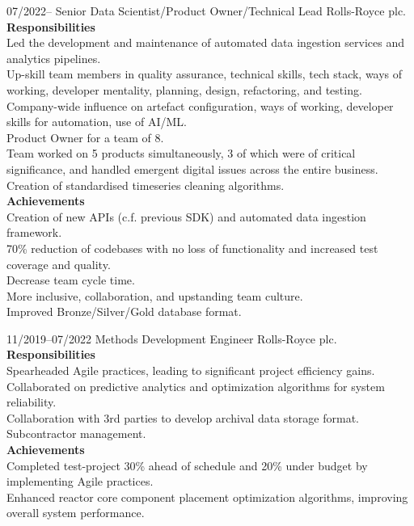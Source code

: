\documentclass[8pt]{developercv}
\begin{document}
\begin{entrylist}
	\entry
	{07/2022--}
	{Senior Data Scientist/Product Owner/Technical Lead}
	{Rolls-Royce plc.}
	{
		\textbf{Responsibilities}\\
		Led the development and maintenance of automated data ingestion services and
		analytics pipelines.\\
		Up-skill team members in quality assurance, technical skills,
		tech stack, ways of working, developer mentality, planning,
		design, refactoring, and testing.\\
		Company-wide influence on artefact configuration, ways of working,
		developer skills for automation, use of AI/ML.\\
		Product Owner for a team of 8.\\
		Team worked on 5 products simultaneously, 3 of which were of critical significance,
		and handled emergent digital issues across the entire business.\\
		Creation of standardised timeseries cleaning algorithms.\\

		\textbf{Achievements}\\
		Creation of new APIs (c.f. previous SDK) and automated data ingestion
		framework.\\
		70\% reduction of codebases with no loss of functionality and increased test
		coverage and quality.\\
		Decrease team cycle time.\\
		More inclusive, collaboration, and upstanding team culture.\\
		Improved Bronze/Silver/Gold database format.
	}

	\entry
	{11/2019--07/2022}
	{Methods Development Engineer}
	{Rolls-Royce plc.}
	{
		\textbf{Responsibilities}\\
		Spearheaded Agile practices, leading to significant project efficiency gains.\\
		Collaborated on predictive analytics and optimization algorithms for system reliability.\\
		Collaboration with 3rd parties to develop archival data storage format.\\
		Subcontractor management.\\

		\textbf{Achievements}\\
		Completed test-project 30\% ahead of schedule and 20\% under budget by
		implementing Agile practices.\\
		Enhanced reactor core component placement optimization algorithms, improving
		overall system performance.\\
	}


\end{entrylist}
\end{document}
